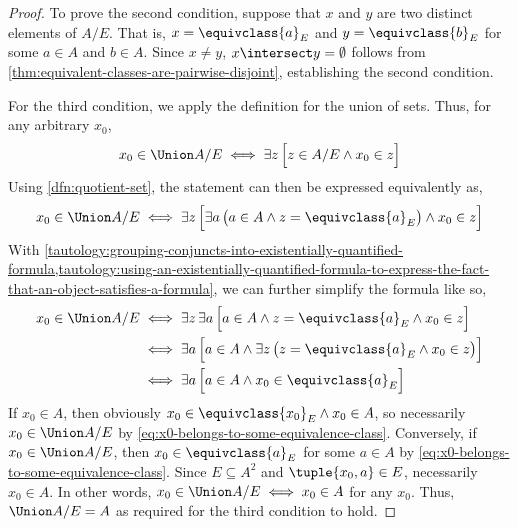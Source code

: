 \begin{proof}
    \vspace{0.3cm}
    \noindent
    To prove the second condition, suppose that \( x \) and \( y \) are two distinct elements of \( A / E \). That is, \( x = \equivclass{a}_{E} \)
    and \( y = \equivclass{b}_{E} \) for some \( a \in A \) and \( b \in A \). Since \( x \neq y \), \( x \intersect y = \emptyset \) follows from
    \cref{thm:equivalent-classes-are-pairwise-disjoint}, establishing the second condition.

    \vspace{0.3cm}
    \noindent
    For the third condition, we apply the definition for the union of sets. Thus, for any arbitrary \( x_{0} \),
    \begin{equation*}
        x_{0} \in \Union A / E
        \iff
        \exists z \, \Big[ z \in A / E \land x_{0} \in z \Big]
    \end{equation*}
    Using \cref{dfn:quotient-set}, the statement can then be expressed equivalently as,
    \begin{equation*}
        x_{0} \in \Union A / E
        \iff
        \exists z \, \Big[ \exists a \, \big( a \in A \land z = \equivclass{a}_{E} \big) \land x_{0} \in z \Big]
    \end{equation*}
    With \cref{tautology:grouping-conjuncts-into-existentially-quantified-formula,tautology:using-an-existentially-quantified-formula-to-express-the-fact-that-an-object-satisfies-a-formula},
    we can further simplify the formula like so,
    \begin{align}
        x_{0} \in \Union A / E &\iff \exists z \, \exists a \, \Big[ a \in A \land z = \equivclass{a}_{E} \land x_{0} \in z \Big] \notag \\
        &\iff \exists a \, \Big[ a \in A \land \exists z \, \big( z = \equivclass{a}_{E} \land x_{0} \in z \big) \Big] \notag \\
        &\iff \exists a \, \Big[ a \in A \land x_{0} \in \equivclass{a}_{E} \Big] \label{eq:x0-belongs-to-some-equivalence-class}
    \end{align}
    If \( x_{0} \in A \), then obviously \( x_{0} \in \equivclass{x_{0}}_{E} \land x_{0} \in A \), so necessarily \( x_{0} \in \Union A/E \) by
    \eqref{eq:x0-belongs-to-some-equivalence-class}. Conversely, if \( x_{0} \in \Union A / E \), then \( x_{0} \in \equivclass{a}_{E} \) for
    some \( a \in A \) by \eqref{eq:x0-belongs-to-some-equivalence-class}. Since \( E \subseteq A^{2} \) and \( \tuple{x_{0}, a} \in E \),
    necessarily \( x_{0} \in A \). In other words, \( x_{0} \in \Union A / E \iff x_{0} \in A \) for any \( x_{0} \). Thus, \( \Union A / E = A \)
    as required for the third condition to hold.


\end{proof}
